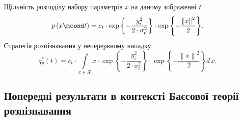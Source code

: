 Щільність розподілу набору параметрів $x$ на даному зображенні $t$
\begin{equation*}
  p\left( x \mcond t \right)
  = c_t
    \cdot \exp{\left\{ - \frac{y_i^2}{2 \cdot \sigma_t^2} \right\}}
    \cdot \exp{\left\{ - \frac{\left\| x \right\|^2}{2} \right\}}.
\end{equation*}
Стратегія розпізнавання у неперервному випадку
\begin{equation*}
  q^*_{\theta}\left( t \right)
  = c_t
    \cdot \int\limits_{x \in X}
      x
      \cdot \exp{\left\{ - \frac{y_i^2}{2 \cdot \sigma_t^2} \right\}}
      \cdot \exp{\left\{ - \frac{\left\| x \right\|^2}{2} \right\}}
    d\,x.
\end{equation*}

\subsection{Попередні результати в контексті Баєсової теорії розпізнавання}

